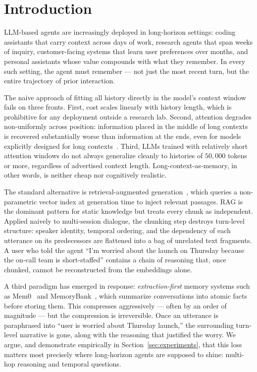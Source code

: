 \section{Introduction}
\label{sec:intro}

LLM-based agents are increasingly deployed in long-horizon settings: coding assistants that carry context across days of work, research agents that span weeks of inquiry, customer-facing systems that learn user preferences over months, and personal assistants whose value compounds with what they remember. In every such setting, the agent must remember --- not just the most recent turn, but the entire trajectory of prior interaction.

The naive approach of fitting all history directly in the model's context window fails on three fronts. First, cost scales linearly with history length, which is prohibitive for any deployment outside a research lab. Second, attention degrades non-uniformly across position: information placed in the middle of long contexts is recovered substantially worse than information at the ends, even for models explicitly designed for long contexts~\citep{liu2024lost}. Third, LLMs trained with relatively short attention windows do not always generalize cleanly to histories of $50{,}000$ tokens or more, regardless of advertised context length. Long-context-as-memory, in other words, is neither cheap nor cognitively realistic.

The standard alternative is retrieval-augmented generation~\citep{lewis2020rag}, which queries a non-parametric vector index at generation time to inject relevant passages. RAG is the dominant pattern for static knowledge but treats every chunk as independent. Applied naively to multi-session dialogue, the chunking step destroys turn-level structure: speaker identity, temporal ordering, and the dependency of each utterance on its predecessors are flattened into a bag of unrelated text fragments. A user who told the agent ``I'm worried about the launch on Thursday because the on-call team is short-staffed'' contains a chain of reasoning that, once chunked, cannot be reconstructed from the embeddings alone.

A third paradigm has emerged in response: \emph{extraction-first} memory systems such as Mem0~\citep{mem0} and MemoryBank~\citep{memorybank}, which summarize conversations into atomic facts before storing them. This compresses aggressively --- often by an order of magnitude --- but the compression is irreversible. Once an utterance is paraphrased into ``user is worried about Thursday launch,'' the surrounding turn-level narrative is gone, along with the reasoning that justified the worry. We argue, and demonstrate empirically in Section~\ref{sec:experiments}, that this loss matters most precisely where long-horizon agents are supposed to shine: multi-hop reasoning and temporal questions.

